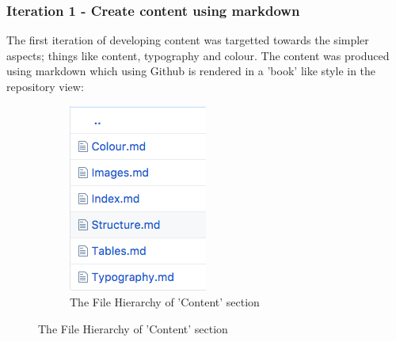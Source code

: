 \subsubsection{Iteration 1 - Create content using markdown}
The first iteration of developing content was targetted towards the simpler
aspects; things like content, typography and colour. The content was produced
using markdown which using Github is rendered in a 'book' like style in the
repository view:

\begin{figure}[H]
    \centering
    \begin{subfigure}[b]{0.25\textwidth}
        \includegraphics[width=\textwidth]{figures/documentation_md_example_1}
        \captionsetup{justification=centering}
        \caption{The File Hierarchy of 'Content' section}
        \label{fig:hierarchy}
    \end{subfigure}
    \qquad

\end{figure}
